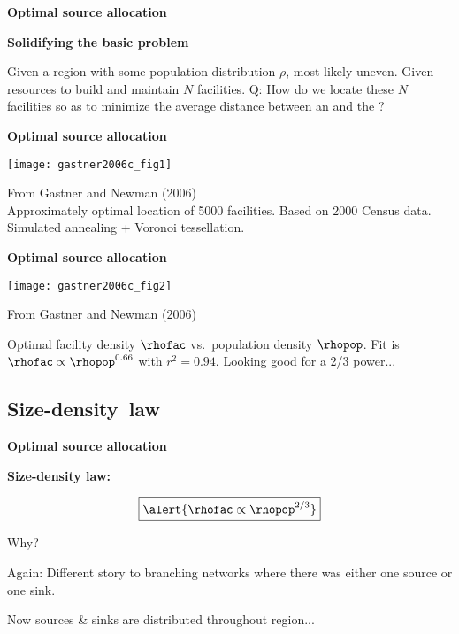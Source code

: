   



  \textbf{Optimal source allocation}

  \textbf{Solidifying the basic problem}
    
     Given a region with some population distribution $\rho$, most likely uneven.
     Given resources to build and maintain $N$ facilities.
     \alert{Q:} How do we locate these $N$ facilities so as to
      \alert{minimize the average distance} between an  and 
      the ?
    
  

  \textbf{Optimal source allocation}

  {\centering
    \texttt{[image: gastner2006c\_fig1]}
  }

  {\small 
    From Gastner and Newman (2006)\cite{gastner2006c}\\
    
     Approximately optimal location of 5000 facilities.
     Based on 2000 Census data.
     Simulated annealing + Voronoi tessellation.
    
  }


  \textbf{Optimal source allocation}

  \begin{center}
    \texttt{[image: gastner2006c\_fig2]}
  \end{center}
  {\small
    From Gastner and Newman (2006)\cite{gastner2006c}
  }
  
   Optimal facility density $\rhofac$ vs.\ population density $\rhopop$.
   Fit is $\rhofac \propto \rhopop^{0.66}$ with $r^2 = 0.94$.
   Looking good for a 2/3 power...
  
  


\subsection{Size-density\ law}

  \textbf{Optimal source allocation}

  \textbf{Size-density law:}
    
    
    $$
    \boxed{\alert{\rhofac \propto \rhopop^{2/3}}}
    $$
    
      Why?
    
      Again: Different story to branching networks where
      there was either one source or one sink.
    
      Now sources \& sinks are distributed 
      throughout region...
    
